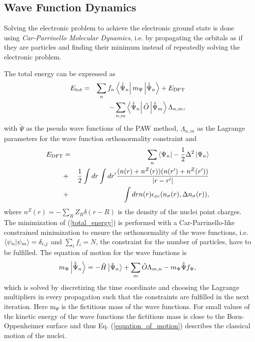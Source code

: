 \documentclass[%
 reprint,
nofootinbib,
 amsmath,amssymb,
 aps,
]{revtex4-2}
\begin{document}
\subsection{Wave Function Dynamics}
Solving the electronic problem to achieve the electronic ground state is done using  \textit{Car-Parrinello Molecular Dynamics}\cite{CP}, i.e. by propagating the orbitals as if they are particles and finding their minimum instead of repeatedly solving the electronic problem. 

The total energy can be expressed as
\begin{eqnarray}
E_{\text{tot}}=&&\sum_nf_n\bra{\dot{\tilde{\Psi}}_n}m_\Psi\ket{\dot{\tilde{\Psi}}_n}+E_{\text{DFT}}\nonumber\\ &&-\sum_{n,m}\bra{\dot{\tilde{\Psi}}_n}\tilde{O}\ket{\dot{\tilde{\Psi}}_m}\Lambda_{n,m}, \label{total_energy}
\end{eqnarray}
with $\tilde{\Psi}$ as the pseudo wave functions of the PAW method, $\Lambda_{n,m}$ as the Lagrange parameters for the wave function orthonormality constraint and 
\begin{eqnarray}
E_{\text{DFT}}&=&\sum_n\bra{\Psi_n}-\frac{1}{2}\Delta^2\ket{\Psi_n} \nonumber\\
&+& \frac{1}{2}\int dr\int dr' \frac{(n(r)+n^Z(r))(n(r')+n^Z(r'))}{|r-r'|} \nonumber\\
&+& \int dr n(r)\epsilon_{xc}(n_\sigma(r), \Delta n_\sigma(r)),
\end{eqnarray}
where $n^Z(r)=-\sum_RZ_R\delta(r-R)$ is the density of the nuclei point charges. 
The minimization of (\ref{total_energy}) is performed with a Car-Parrinello-like constrained minimization to ensure the orthonormality of the wave functions, i.e. $\braket{\psi_n}{\psi_m}=\delta_{i,j}$ and $\sum_if_i=N$, the constraint for the number of particles, have to be fulfilled. 
The equation of motion for the wave functions is
\begin{eqnarray}
m_\Psi\ket{\ddot{\tilde{\Psi}}_n}=-\tilde{H}\ket{\tilde{\Psi}_n}+\sum_m\tilde{O}\Lambda_{m,n}-m_\Psi\dot{\tilde{\Psi}}f_\Psi, \label{equation_of_motion}
\end{eqnarray}
which is solved by discretizing the time coordinate and choosing the Lagrange multipliers in every propagation such that the constraints are fulfilled in the next iteration. 
Here m$_\Psi$ is the fictitious mass of the wave functions. For small values of the kinetic energy of the wave functions the fictitious mass is close to the Born-Oppenheimer surface and thus Eq. (\ref{equation_of_motion}) describes the classical motion of the nuclei. 
\end{document}
